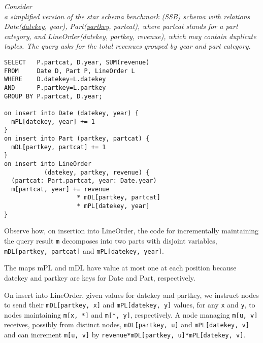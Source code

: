 \begin{example}\em
\label{ex:ssb}
Con\-sider \\ a simplified version of the star schema
benchmark (SSB) schema with relations Date(\underline{datekey}, year),
Part(\underline{partkey}, partcat), where partcat stands for a part category,
and LineOrder(datekey, partkey, revenue), which may contain duplicate tuples.
The query asks for the total revenues grouped by year and part category.

\begin{verbatim}
SELECT   P.partcat, D.year, SUM(revenue)
FROM     Date D, Part P, LineOrder L
WHERE    D.datekey=L.datekey
AND      P.partkey=L.partkey
GROUP BY P.partcat, D.year;

on insert into Date (datekey, year) {
  mPL[datekey, year] += 1
}
on insert into Part (partkey, partcat) {
  mDL[partkey, partcat] += 1
}
on insert into LineOrder
           (datekey, partkey, revenue) {
  (partcat: Part.partcat, year: Date.year)
  m[partcat, year] += revenue
                    * mDL[partkey, partcat]
                    * mPL[datekey, year]
}
\end{verbatim}

Observe how, on insertion into LineOrder, the code for incrementally
maintaining the query result {\tt m} decomposes into
two parts with disjoint variables, 
{\tt mDL[partkey, partcat]} and {\tt mPL[datekey, year]}.

The maps mPL and mDL have value at most
one at each position because datekey and partkey are keys for Date and Part,
respectively.

On insert into LineOrder, given values for
datekey and partkey, we instruct nodes
to send their {\tt mDL[partkey, x]} and {\tt mPL[datekey, y]} values,
for any {\tt x} and {\tt y},
to nodes maintaining {\tt m[x, *]} and {\tt m[*, y]}, respectively.
A node managing {\tt m[u, v]} receives, possibly from distinct nodes,
{\tt mDL[partkey, u]} and {\tt mPL[datekey, v]}
and can increment {\tt m[u, v]} by
{\tt revenue*mDL[partkey, u]*mPL[datekey, v]}.
%
\punto
\end{example}



